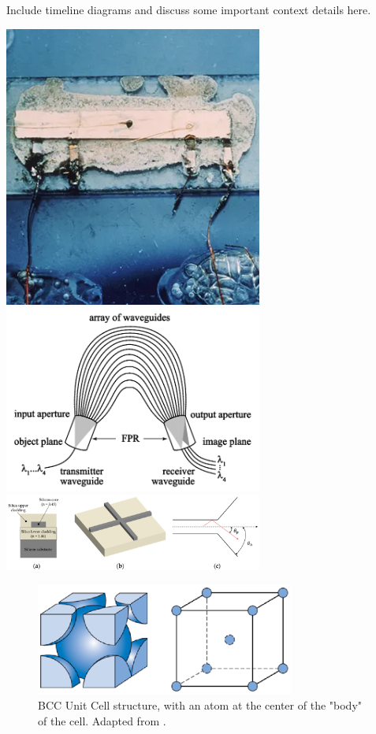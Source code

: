 \documentclass[10pt]{article}
\begin{document}
Include timeline diagrams and discuss some important context details here.

\includegraphics[width=8.5cm]{Jack-Kilby.png}
\includegraphics[width=8.5cm]{AWG.png}
\includegraphics[width=8.5cm]{Silicon-Waveguide.png}


\begin{figure}[h]
    \centering
    \includegraphics[width=8.5cm]{fig1.eps}
    \caption{\label{tab1}BCC Unit Cell structure, with an atom at the center of the "body" of the cell. Adapted from \cite{ref01}.} 
    \end{figure}
\end{document}
